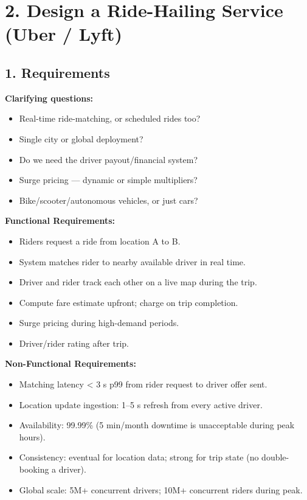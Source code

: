 \documentclass[11pt]{article}
\providecommand{\tightlist}{\setlength{\itemsep}{1pt}\setlength{\parskip}{0pt}}
\begin{document}
\section{2. Design a Ride-Hailing Service (Uber / Lyft)}\label{2-design-a-ride-hailing-service-uber--lyft}

\subsection{1. Requirements}\label{1-requirements-1}

\textbf{Clarifying questions:}

\begin{itemize}
\tightlist
\item
  Real-time ride-matching, or scheduled rides too?
\item
  Single city or global deployment?
\item
  Do we need the driver payout/financial system?
\item
  Surge pricing --- dynamic or simple multipliers?
\item
  Bike/scooter/autonomous vehicles, or just cars?
\end{itemize}

\textbf{Functional Requirements:}

\begin{itemize}
\tightlist
\item
  Riders request a ride from location A to B.
\item
  System matches rider to nearby available driver in real time.
\item
  Driver and rider track each other on a live map during the trip.
\item
  Compute fare estimate upfront; charge on trip completion.
\item
  Surge pricing during high-demand periods.
\item
  Driver/rider rating after trip.
\end{itemize}

\textbf{Non-Functional Requirements:}

\begin{itemize}
\tightlist
\item
  Matching latency \textless{} 3 s p99 from rider request to driver offer sent.
\item
  Location update ingestion: 1--5 s refresh from every active driver.
\item
  Availability: 99.99\% (5 min/month downtime is unacceptable during peak hours).
\item
  Consistency: eventual for location data; strong for trip state (no double-booking a driver).
\item
  Global scale: 5M+ concurrent drivers; 10M+ concurrent riders during peak.
\end{itemize}
\end{document}
